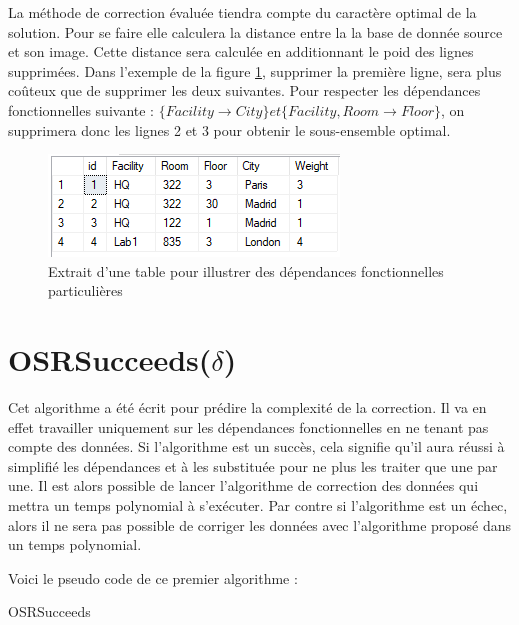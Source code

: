 \documentclass[12pt, a4paper, oneside, titlepage]{book}%
\makeatletter
\def\BState{\State\hskip-\ALG@thistlm}
\makeatother
\begin{document}
La méthode de correction évaluée tiendra compte du caractère optimal de la solution. Pour se faire elle calculera la distance entre la la base de donnée source et son image. Cette distance sera calculée en additionnant le poid des lignes supprimées.
Dans l'exemple de la figure \ref{picDFnok}, supprimer la première ligne, sera plus coûteux que de supprimer les deux suivantes. Pour respecter les dépendances fonctionnelles suivante : $\{ Facility \rightarrow City \} et \{ Facility, Room \rightarrow Floor \}$, on supprimera donc les lignes 2 et 3 pour obtenir le sous-ensemble optimal.

\begin{figure}[ht]
	\center
	\includegraphics{DFnok.png}
	\caption{\label{picDFnok} Extrait d'une table pour illustrer des dépendances fonctionnelles particulières}
\end{figure}


\section{OSRSucceeds($\delta$)}

Cet algorithme a été écrit pour prédire la complexité de la correction. Il va en effet travailler uniquement sur les dépendances fonctionnelles en ne tenant pas compte des données. Si l'algorithme est un succès, cela signifie qu'il aura réussi à simplifié les dépendances et à les substituée pour ne plus les traiter que une par une. Il est alors possible de lancer l'algorithme de correction des données qui mettra un temps polynomial à s'exécuter. Par contre si l'algorithme est un échec, alors il ne sera pas possible de corriger les données avec l'algorithme proposé dans un temps polynomial.

Voici le pseudo code de ce premier algorithme : 
\begin{algorithm}
\caption{OSRSucceeds}\label{euclid}
\end{algorithm}
\end{document}
